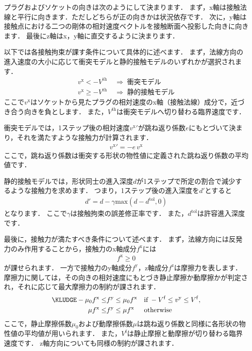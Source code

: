 \KLUDGE プラグおよびソケットの向きは次のようにして決まります．
\KLUDGE まず，x軸は接触法線と平行に向きます．ただしどちらが正の向きかは状況依存です．
\KLUDGE 次に，y軸は接触点における二つの剛体の相対速度ベクトルを接触断面へ投影した向きに向きます．
\KLUDGE 最後にz軸はx，y軸に直交するように決まります．

\KLUDGE 以下では各接触拘束が課す条件について具体的に述べます．
\KLUDGE まず，法線方向の進入速度の大小に応じて衝突モデルと静的接触モデルのいずれかが選択されます．
\begin{align*}
v^\mathrm{x} < -V^\mathrm{th}   \;\; &\Rightarrow \;\; \text{衝突モデル} \\
v^\mathrm{x} \ge -V^\mathrm{th} \;\; &\Rightarrow \;\; \text{静的接触モデル}
\end{align*}
\KLUDGE ここで$v^\mathrm{x}$はソケットから見たプラグの相対速度のx軸（接触法線）成分で，近づき合う向きを負とします．
\KLUDGE また，$V^\mathrm{th}$は衝突モデルへ切り替わる臨界速度です．

\KLUDGE 衝突モデルでは，1ステップ後の相対速度${v^\mathrm{x}}'$が跳ね返り係数$e$にもとづいて決まり，それを満たすような接触力が計算されます．
\begin{align}
{v^\mathrm{x}}' = - e \, v^\mathrm{x}
\end{align}
\KLUDGE ここで，跳ね返り係数は衝突する形状の物性値に定義された跳ね返り係数の平均値です．
\KLUDGE %
\KLUDGE %

\KLUDGE 静的接触モデルでは，形状同士の進入深度$d$が1ステップで所定の割合で減少するような接触力を求めます．
\KLUDGE つまり，1ステップ後の進入深度を$d'$とすると
\begin{align}
d' = d - \gamma \mathrm{max}(d - d^\mathrm{tol}, 0)
\end{align}
\KLUDGE となります．
\KLUDGE ここで$\gamma$は接触拘束の誤差修正率です．
\KLUDGE また，$d^\mathrm{tol}$は許容進入深度です．

\KLUDGE 最後に，接触力が満たすべき条件について述べます．
\KLUDGE まず，法線方向には反発力のみ作用することから，接触力のx軸成分$f^\mathrm{x}$には
\begin{align*}
f^\mathrm{x} \ge 0
\end{align*}
\KLUDGE が課せられます．
\KLUDGE 一方で接触力のy軸成分$f^\mathrm{y}$，z軸成分$f^\mathrm{z}$は摩擦力を表します．
\KLUDGE 摩擦力に関しては，その向きの相対速度にもとづき静止摩擦か動摩擦かが判定され，それに応じて最大摩擦力の制約が課されます．
\begin{align*}
\KLUDGE -\mu_0 f^\mathrm{x} \le &f^\mathrm{y} \le \mu_0 f^\mathrm{x} & & \text{if} \; -V^\mathrm{f} \le v^\mathrm{y} \le V^\mathrm{f},\\
 \mu   f^\mathrm{x} \le &f^\mathrm{y} \le \mu   f^\mathrm{x} & & \text{otherwise}
\end{align*}
\KLUDGE ここで，静止摩擦係数$\mu_0$および動摩擦係数$\mu$は跳ね返り係数と同様に各形状の物性値の平均値が用いられます．
\KLUDGE また，$V^\mathrm{f}$は静止摩擦と動摩擦が切り替わる臨界速度です．
z軸方向についても同様の制約が課されます．

